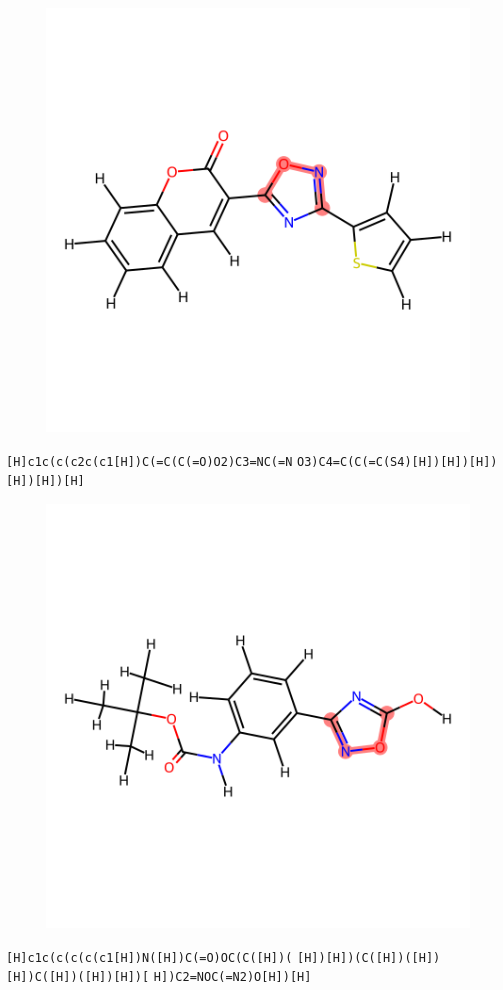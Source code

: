 \documentclass{article}
\begin{document}
\begin{figure}[ht]
\centering
    \includegraphics{mol240.png}
\end{figure}
\verb|[H]c1c(c(c2c(c1[H])C(=C(C(=O)O2)C3=NC(=N| \verb|O3)C4=C(C(=C(S4)[H])[H])[H])[H])[H])[H]|

\begin{figure}[ht]
\centering
    \includegraphics{mol241.png}
\end{figure}
\verb|[H]c1c(c(c(c(c1[H])N([H])C(=O)OC(C([H])(| \verb|[H])[H])(C([H])([H])[H])C([H])([H])[H])[| \verb|H])C2=NOC(=N2)O[H])[H]|
\end{document}
